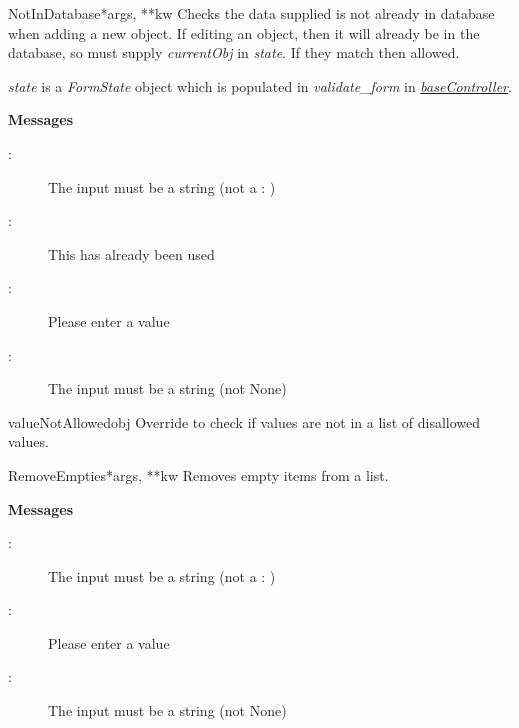 \documentclass[letterpaper,10pt,english]{manual}
\begin{document}
\hypertarget{webscavator.forms.validators.NotInDatabase}{}\begin{classdesc}{NotInDatabase}{*args, **kw}
Checks the data supplied is not already in database when adding a new object. 
If editing an object, then it will already be in the database, so must supply 
\emph{currentObj} in \emph{state}. If they match then allowed.

\emph{state} is a \emph{FormState} object which is populated in \emph{validate\_form} in
\hyperlink{--doc-baseController}{\emph{baseController}}.

\textbf{Messages}
\begin{description}
\item[:]
The input must be a string (not a : )

\item[:]
This has already been used

\item[:]
Please enter a value

\item[:]
The input must be a string (not None)

\end{description}

\hypertarget{webscavator.forms.validators.NotInDatabase.valueNotAllowed}{}\begin{methoddesc}{valueNotAllowed}{obj}
Override to check if values are not in a list of disallowed values.
\end{methoddesc}
\end{classdesc}

\hypertarget{webscavator.forms.validators.RemoveEmpties}{}\begin{classdesc}{RemoveEmpties}{*args, **kw}
Removes empty items from a list.

\textbf{Messages}
\begin{description}
\item[:]
The input must be a string (not a : )

\item[:]
Please enter a value

\item[:]
The input must be a string (not None)

\end{description}
\end{classdesc}
\end{document}
